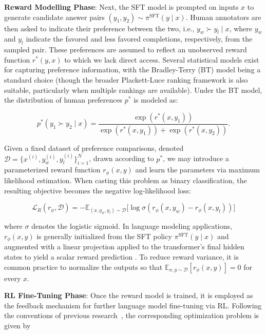 \textbf{Reward Modelling Phase}: Next, the SFT model is prompted on inputs $x$ to generate candidate answer pairs $(y_1, y_2)\sim \pi^\text{SFT}(y \mid x)$. Human annotators are then asked to indicate their preference between the two, i.e., $y_w\succ y_l \mid x$, where $y_w$ and $y_l$ indicate the favored and less favored completions, respectively, from the sampled pair. These preferences are assumed to reflect an unobserved reward function $r^*(y, x)$ to which we lack direct access. Several statistical models exist for capturing preference information, with the Bradley-Terry (BT) \cite{bradley1952rankanalysis} model being a standard choice (though the broader Plackett-Luce ranking framework \citep{plackett1975analysis, luce2012individual} is also suitable, particularly when multiple rankings are available). Under the BT model, the distribution of human preferences $p^*$ is modeled as:

\begin{equation}\label{eq:bradley-terry}
    p^*(y_1\succ y_2 \mid x)=\frac{\exp\left(r^*(x, y_1)\right)}{\exp\left(r^*(x, y_1)\right) + \exp\left(r^*(x, y_2)\right)}.
\end{equation}

Given a fixed dataset of preference comparisons, denoted $\mathcal{D} = \bigl\{x^{(i)}, y_w^{(i)}, y_l^{(i)}\bigr\}_{i=1}^N$, drawn according to $p^*$, we may introduce a parameterized reward function $r_{\phi}(x, y)$ and learn the parameters via maximum likelihood estimation. When casting this problem as binary classification, the resulting objective becomes the negative log-likelihood loss:

\begin{equation}\label{eq:reward_model}
    \mathcal{L}_R(r_{\phi}, \mathcal{D}) = -\mathbb{E}_{(x, y_w, y_l)\sim \mathcal{D}}\bigl[\log \sigma(r_{\phi}(x, y_w)- r_{\phi}(x, y_l))\bigr]
\end{equation}

where $\sigma$ denotes the logistic sigmoid. In language modeling applications, $r_{\phi}(x, y)$ is generally initialized from the SFT policy $\pi^\text{SFT}(y \mid x)$ and augmented with a linear projection applied to the transformer’s final hidden states to yield a scalar reward prediction \cite{ziegler2020finetuning}. To reduce reward variance, it is common practice to normalize the outputs so that $\mathbb{E}_{x,y\sim \mathcal{D}}\left[r_\phi(x, y)\right] = 0$ for every $x$.

\textbf{RL Fine-Tuning Phase}: Once the reward model is trained, it is employed as the feedback mechanism for further language model fine-tuning via RL. Following the conventions of previous research~\citep{jaques2017sequence, jaques2020human}, the corresponding optimization problem is given by


